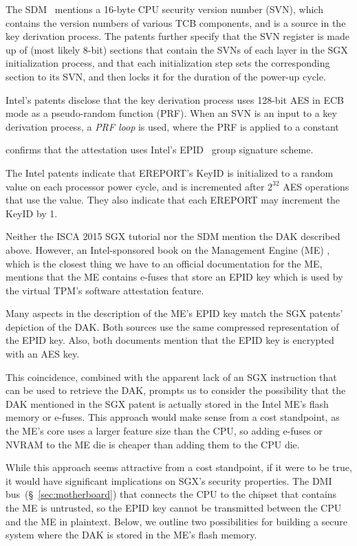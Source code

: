 The SDM~\cite{intel2015sdm} mentions a 16-byte CPU security version number
(SVN), which contains the version numbers of various TCB components, and is a
source in the key derivation process. The patents further specify that the SVN
register is made up of (most likely 8-bit) sections that contain the SVNs of
each layer in the SGX initialization process, and that each initialization step
sets the corresponding section to its SVN, and then locks it for the duration
of the power-up cycle.

Intel's patents disclose that the key derivation process uses 128-bit AES in
ECB mode as a pseudo-random function (PRF). When an SVN is an input to a key
derivation process, a \textit{PRF loop} is used, where the PRF is applied to
a constant

\cite{anati2013sgx} confirms that the attestation uses Intel's
EPID~\cite{brickell2009epid} group signature scheme.

The Intel patents indicate that EREPORT's KeyID is initialized to a random
value on each processor power cycle, and is incremented after $2^{32}$ AES
operations that use the value. They also indicate that each EREPORT may
increment the KeyID by 1.



Neither the ISCA 2015 SGX tutorial nor the SDM mention the DAK described above.
However, an Intel-sponsored book on the Management Engine (ME)
\cite{ruan2014intelme}, which is the closest thing we have to an official
documentation for the ME, mentions that the ME contains e-fuses that store an
EPID key which is used by the virtual TPM's software attestation feature.

Many aspects in the description of the ME's EPID key match the SGX patents'
depiction of the DAK. Both sources use the same compressed representation of
the EPID key. Also, both documents mention that the EPID key is encrypted with
an AES key.

This coincidence, combined with the apparent lack of an SGX instruction that
can be used to retrieve the DAK, prompts us to consider the possibility that
the DAK mentioned in the SGX patent is actually stored in the Intel ME's flash
memory or e-fuses. This approach would make sense from a cost standpoint, as
the ME's core uses a larger feature size than the CPU, so adding e-fuses or
NVRAM to the ME die is cheaper than adding them to the CPU die.

While this approach seems attractive from a cost standpoint, if it were to be
true, it would have significant implications on SGX's security properties. The
DMI bus~(\S~\ref{sec:motherboard}) that connects the CPU to the chipset that
contains the ME is untrusted, so the EPID key cannot be transmitted between the
CPU and the ME in plaintext. Below, we outline two possibilities for building a
secure system where the DAK is stored in the ME's flash memory.

